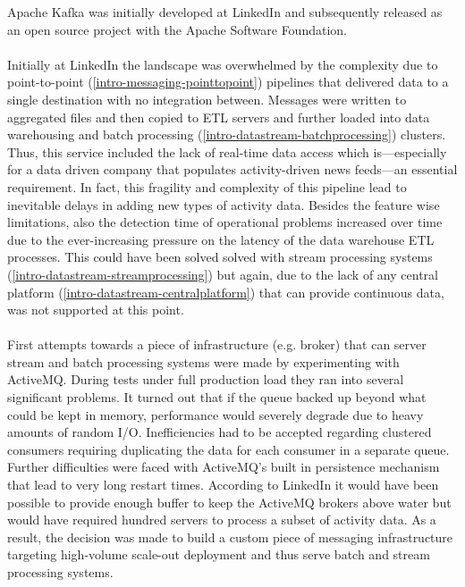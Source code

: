 Apache Kafka was initially developed at LinkedIn\cite{linkedin} and subsequently
released as an open source project with the Apache Software
Foundation\cite{apachefoundation}. 
\\ \\
Initially at LinkedIn the landscape was overwhelmed by the complexity due to
point-to-point (\ref{intro-messaging-pointtopoint})
pipelines that delivered data to a single destination with no
integration between. Messages were written to aggregated files and then copied
to ETL servers and further loaded into data warehousing and batch
processing (\ref{intro-datastream-batchprocessing})
clusters. Thus, this service included the lack of real-time data access which
is---especially for a data driven company that populates activity-driven news
feeds---an essential requirement. In fact, this fragility and complexity of this
pipeline lead to inevitable delays in adding new types of activity data.
Besides the feature wise limitations, also the detection time of operational
problems increased over time due to the ever-increasing pressure on the latency
of the data warehouse ETL processes. This could have been solved solved with
stream processing systems (\ref{intro-datastream-streamprocessing}) but again, 
due to the lack of any central platform (\ref{intro-datastream-centralplatform})
that can provide continuous data, was not supported at this point.
\\ \\
First attempts towards a piece of infrastructure (e.g. broker) that can server
stream and batch processing systems were made by experimenting with
ActiveMQ\cite{activemq}. During tests under full production load they ran into
several significant problems. It turned out that if the queue backed up beyond what could
be kept in memory, performance would severely degrade due to heavy amounts of
random I/O. Inefficiencies had to be accepted regarding clustered consumers
requiring duplicating the data for each consumer in a separate queue. Further
difficulties were faced with ActiveMQ's built in persistence mechanism that lead
to very long restart times. 
According to LinkedIn it would have been possible to provide enough buffer to
keep the ActiveMQ brokers above water but would have required hundred servers to
process a subset of activity data. As a result, the decision was made to build a
custom piece of messaging infrastructure targeting high-volume scale-out
deployment and thus serve batch and stream processing systems. 


